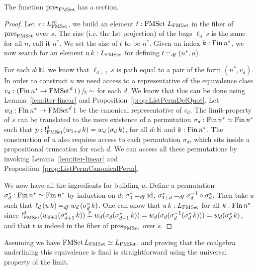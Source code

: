 \documentclass[a4paper,USenglish,cleveref]{lipics-v2021}
\begin{document}
\begin{theorem}\label{thm:PresFMSetSection}
 The function $\pres{\FMSet}$ has a section.
\end{theorem}
\begin{proof}
  Let $s : \LimSh{\FMSet}$, we build an element $t : \FMSet \,\Lim{\FMSet}$ in the fiber of $\pres{\FMSet}$ over $s$. The size (i.e. the 1st projection) of the bags $\ell_n\,s$ is the same for all $n$, call it $n^*$. We set the size of $t$ to be $n^*$. Given an index $k : \Fin n^*$, we now search for an element $u\,k : \Lim{\FMSet}$ for defining $t \DefEq (n^*,u)$.

  For each $d : ℕ$, we know that $\ell_{d + 1}\,s$ is path equal to a pair of the form $(n^*,v_d)$. In order to construct $u$ we need access to a representative of the equivalence class $v_d : \SetQuot[(\Fin n^* \to \FMSet^d 1)][\sim]$ for each $d$. We know that this can be done using Lemma~\ref{lem:iter-linear} and Proposition~\ref{prop:ListPermDefQuot}. Let $w_d : \Fin n^* \to \FMSet^d 1$ be the canonical representative of $v_d$.
  The limit-property of $s$ can be translated to the mere existence of a permutation $\sigma_d : \Fin n^* \simeq \Fin n^*$
  such that $p : \Bang_{\FMSet}^d(w_{1 + d}\, k) = w_d \,(\sigma_d\,k)$, for all $d: ℕ$ and $k : \Fin n^*$. The construction of $u$ also requires access to each permutation $\sigma_d$, which sits inside a propositional truncation for each $d$. We can access all these permutations by invoking Lemma~\ref{lem:iter-linear} and Proposition~\ref{prop:ListPermCanonicalPerm}.

  We now have all the ingredients for building $u$. Define a permutation $\sigma^*_d : \Fin n^* \simeq \Fin n^*$ by induction on $d$: $\sigma^*_0 \DefEq \Op{id}$, $\sigma^*_{1+d} \DefEq \sigma_d^{-1} \circ \sigma^*_d$. Then take $u$ such that $\ell_d \,(u\,k) \DefEq w_d\,(\sigma^*_d \,k)$. One can show that $u\,k : \Lim{\FMSet}$ for all $k : \Fin n^*$ since
  $\Bang_{\FMSet}^d (w_{d+1}(\sigma^*_{d+1}\, k)) \stackrel{p}{=} w_d (\sigma_d (\sigma^*_{d+1}\, k)) = w_d (\sigma_d (\sigma_d^{-1} (\sigma^*_d\, k))) = w_d (\sigma^*_d\, k)$,
  and that $t$ is indeed in the fiber of $\pres{\FMSet}$ over $s$.
\end{proof}

Assuming \LLPO{} we have $\FMSet \Lim{\FMSet} \simeq \Lim{\FMSet}$, and proving that the coalgebra underlining this equivalence is final is straightforward using the universal property of the limit.
\end{document}
